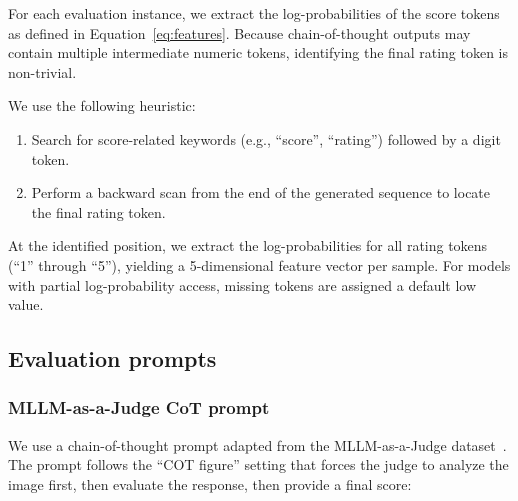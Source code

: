 \documentclass{article}
\begin{document}
For each evaluation instance, we extract the log-probabilities of the score tokens as defined in Equation~\ref{eq:features}. Because chain-of-thought outputs may contain multiple intermediate numeric tokens, identifying the final rating token is non-trivial.

We use the following heuristic:
\begin{enumerate}
\item Search for score-related keywords (e.g., ``score'', ``rating'') followed by a digit token.
\item Perform a backward scan from the end of the generated sequence to locate the final rating token.
\end{enumerate}

At the identified position, we extract the log-probabilities for all rating tokens (``1'' through ``5''), yielding a 5-dimensional feature vector per sample. For models with partial log-probability access, missing tokens are assigned a default low value.

\subsection{Evaluation prompts}
\label{app:prompts}

\subsubsection{MLLM-as-a-Judge CoT prompt}

We use a chain-of-thought prompt adapted from the MLLM-as-a-Judge dataset~\citep{chen2024mllmasajudge}. The prompt follows the ``COT figure'' setting that forces the judge to analyze the image first, then evaluate the response, then provide a final score:
\end{document}

